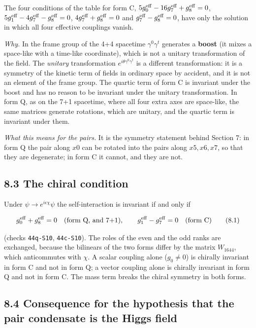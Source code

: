 \documentclass[
  10pt,
]{article}
\begin{document}
The four conditions of the table for form C,
\(5g_0^{\rm eff}-16g_7^{\rm eff}+g_8^{\rm eff}=0\),
\(5g_1^{\rm eff}-4g_7^{\rm eff}-g_8^{\rm eff}=0\),
\(4g_7^{\rm eff}+g_8^{\rm eff}=0\) and
\(g_7^{\rm eff}-g_8^{\rm eff}=0\), have only the solution in which all
four effective couplings vanish.

\emph{Why.} In the frame group of the 4+4 spacetime \(\gamma^0\gamma^t\)
generates a \textbf{boost} (it mixes a space-like with a time-like
coordinate), which is not a unitary transformation of the field. The
\emph{unitary} transformation \(e^{i\theta\gamma^0\gamma^t}\) is a
different transformation: it is a symmetry of the kinetic term of fields
in ordinary space by accident, and it is not an element of the frame
group. The quartic term of form C is invariant under the boost and has
no reason to be invariant under the unitary transformation. In form Q,
as on the 7+1 spacetime, where all four extra axes are space-like, the
same matrices generate rotations, which are unitary, and the quartic
term is invariant under them.

\emph{What this means for the pairs.} It is the symmetry statement
behind Section 7: in form Q the pair along \(x0\) can be rotated into
the pairs along \(x5,x6,x7\), so that they are degenerate; in form C it
cannot, and they are not.

\hypertarget{the-chiral-condition}{%
\subsection{8.3 The chiral condition}\label{the-chiral-condition}}

Under \(\psi\to e^{i\epsilon\chi}\psi\) the self-interaction is
invariant if and only if

\[g_0^{\rm eff}+g_8^{\rm eff}=0\quad\text{(form Q, and 7+1)},\qquad
g_1^{\rm eff}-g_7^{\rm eff}=0\quad\text{(form C)}\tag{8.1}\]

(checks \texttt{44q-S10}, \texttt{44c-S10}). The roles of the even and
the odd ranks are exchanged, because the bilinears of the two forms
differ by the matrix \(W_{1644}\), which anticommutes with \(\chi\). A
scalar coupling alone (\(g_0\neq0\)) is chirally invariant in form C and
not in form Q; a vector coupling alone is chirally invariant in form Q
and not in form C. The mass term breaks the chiral symmetry in both
forms.

\hypertarget{consequence-for-the-hypothesis-that-the-pair-condensate-is-the-higgs-field}{%
\subsection{8.4 Consequence for the hypothesis that the pair condensate
is the Higgs
field}\label{consequence-for-the-hypothesis-that-the-pair-condensate-is-the-higgs-field}}
\end{document}
